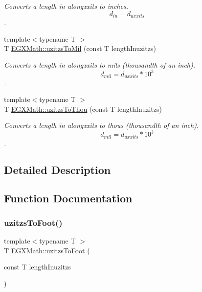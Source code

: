 \begin{DoxyCompactItemize}
\begin{DoxyCompactList}\small\item\em Converts a length in ulongxxits to inches. \[ d_{in}=d_{uxxits} \]. \end{DoxyCompactList}\item 
{\footnotesize template$<$typename T $>$ }\\T \mbox{\hyperlink{group___e_g_x_math-_conversions-_length_conversions-uzitzs-_imperial_ga53d4abecb2e7ac39c15c4ef89b9447a9}{E\+G\+X\+Math\+::uzitzs\+To\+Mil}} (const T length\+Inuzitzs)
\begin{DoxyCompactList}\small\item\em Converts a length in ulongxxits to mils (thousandth of an inch). \[ d_{mil}=d_{uxxits} * 10^{3} \]. \end{DoxyCompactList}\item 
{\footnotesize template$<$typename T $>$ }\\T \mbox{\hyperlink{group___e_g_x_math-_conversions-_length_conversions-uzitzs-_imperial_gaa11694f9026bf30e29bd716a35c05b4e}{E\+G\+X\+Math\+::uzitzs\+To\+Thou}} (const T length\+Inuzitzs)
\begin{DoxyCompactList}\small\item\em Converts a length in ulongxxits to thous (thousandth of an inch). \[ d_{mil}=d_{uxxits} * 10^{3} \]. \end{DoxyCompactList}\end{DoxyCompactItemize}


\subsection{Detailed Description}


\subsection{Function Documentation}
\mbox{\label{group___e_g_x_math-_conversions-_length_conversions-uzitzs-_imperial_gaafdc16c327535a3ea42909a5ebadac71}} 
\subsubsection{\texorpdfstring{uzitzs\+To\+Foot()}{uzitzsToFoot()}}
{\footnotesize\ttfamily template$<$typename T $>$ \\
T E\+G\+X\+Math\+::uzitzs\+To\+Foot (\begin{DoxyParamCaption}\item[{const T}]{length\+Inuzitzs }\end{DoxyParamCaption})}



